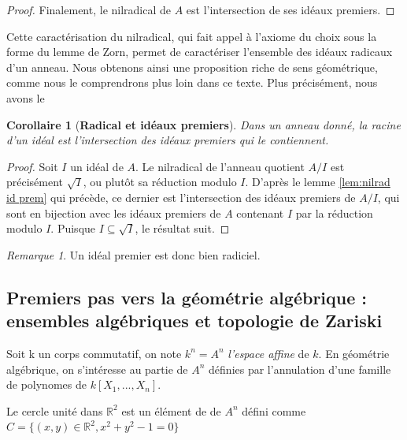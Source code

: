 \documentclass[10pt, twoside]{article}
\theoremstyle{plain}
\theoremstyle{definition}
\theoremstyle{plain}
\newtheorem{corollary}{Corollaire}[theorem]
\theoremstyle{plain}
\theoremstyle{definition}
\theoremstyle{remark}
\newtheorem*{remark}{Remarque}
\begin{document}
\begin{proof}
    Finalement, le nilradical de $A$ est l'intersection de ses idéaux premiers.
\end{proof}

Cette caractérisation du nilradical, qui fait appel à l'axiome du choix sous la forme du lemme de Zorn, permet de caractériser l'ensemble des idéaux radicaux d'un anneau. Nous obtenons ainsi une proposition riche de sens géométrique, comme nous le comprendrons plus loin dans ce texte. Plus précisément, nous avons le

\begin{corollary}[\textbf{Radical et idéaux premiers}]\label{thm:rad id prem}
    Dans un anneau donné, la racine d'un idéal est l'intersection des idéaux premiers qui le contiennent.
\end{corollary}

\begin{proof}
    Soit $I$ un idéal de $A$. Le nilradical de l'anneau quotient $A/I$ est précisément $\sqrt{I}$, ou plutôt sa réduction modulo $I$. D'après le lemme \ref{lem:nilrad id prem} qui précède, ce dernier est l'intersection des idéaux premiers de $A/I$, qui sont en bijection avec les idéaux premiers de $A$ contenant $I$ par la réduction modulo $I$. Puisque $I \subseteq \sqrt{I}$, le résultat suit.
\end{proof}

\begin{remark}
    Un idéal premier est donc bien radiciel.
\end{remark}



\subsection{Premiers pas vers la géométrie algébrique : ensembles algébriques et topologie de Zariski}


Soit k un corps commutatif, on note $k^{n} = A^{n}$ \textit{l'espace affine} de $k$.  En géométrie algébrique, on s'intéresse au partie de $A^n$ définies par l'annulation d'une famille de polynomes de $k[X_{1},...,X_{n}]$.


Le cercle unité dans $\mathbb{R}^{2}$ est un élément de de $A^{n}$ défini comme $C= \{(x,y) \in \mathbb{R}^{2} , x^{2} + y^{2} - 1 = 0 \} $ 


\begin{center}
\end{center}
\end{document}
